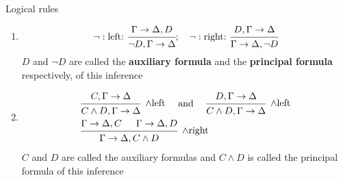 \documentclass[11pt]{article}
\begin{document}
Logical rules
\begin{enumerate}
\item \begin{equation*}
\neg:\text{left: }
\begin{prooftree}
\hypo{\Gamma\to\Delta,D}
\infer1{\neg D,\Gamma\to\Delta}
\end{prooftree};\quad
\neg:\text{right: }
\begin{prooftree} 
\hypo{D,\Gamma\to\Delta}
\infer1{\Gamma\to\Delta,\neg D}
\end{prooftree}
\end{equation*}
\(D\) and \(\neg D\) are called the \textbf{auxiliary formula} and the \textbf{principal
formula} respectively, of this inference
\item \begin{align*}
&
\begin{prooftree}
\hypo{C,\Gamma\to\Delta}
\infer1[\(\wedge\)left]{C\wedge D,\Gamma\to\Delta}
\end{prooftree}\quad\text{ and }\quad
\begin{prooftree}
\hypo{D,\Gamma\to\Delta}
\infer1[\(\wedge\)left]{C\wedge D,\Gamma\to\Delta}
\end{prooftree}\\
&
\begin{prooftree}[center=false]
\hypo{\Gamma\to\Delta,C}
\hypo{\Gamma\to\Delta,D}
\infer2[\(\wedge\)right]{\Gamma\to\Delta,C\wedge D}
\end{prooftree}
\end{align*}
\(C\) and \(D\) are called the auxiliary formulas and \(C\wedge D\) is
called the principal formula of this inference


\end{enumerate}
\end{document}
